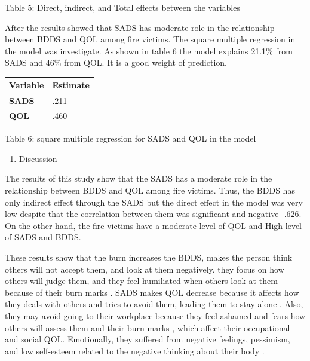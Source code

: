 \documentclass[10pt]{NSP1}
\makeatletter
\newcommand\jltx@wideopen{\par\addvspace{\medskipamount}\noindent}
\newcommand\jltx@wideclose{\par\addvspace{\medskipamount}}
\newenvironment{jltxspan}
  {\if@twocolumn\let\jltx@spannext\strip\else\let\jltx@spannext\jltx@wideopen\fi\jltx@spannext}
  {\if@twocolumn\let\jltx@spanend\endstrip\else\let\jltx@spanend\jltx@wideclose\fi\jltx@spanend}
\newcommand\JLTXaboveplacement{\par\addvspace{6pt plus 2pt minus 2pt}\noindent}
\newcommand\JLTXbelowplacement{\par\addvspace{6pt plus 2pt minus 2pt}}
\makeatother
\begin{document}
Table 5: Direct, indirect, and Total effects between the variables

After the results showed that SADS has moderate role in the relationship between BDDS and QOL among fire victims. The square multiple regression in the model was investigate. As shown in table 6 the model explains 21.1\% from SADS and 46\% from QOL. It is a good weight of prediction.

\JLTXaboveplacement \begin{jltxspan}%
\noindent\begin{minipage}{\linewidth}%
\centering
{\small
\begin{tabular}{|>{\centering\arraybackslash}p{}|>{\centering\arraybackslash}p{}|}
\hline
\cellcolor[HTML]{DDD9C3}\textbf{Variable} & \textbf{Estimate} \\
\hline
\cellcolor[HTML]{DDD9C3}\textbf{SADS} & .211 \\
\hline
\cellcolor[HTML]{DDD9C3}\textbf{QOL} & .460 \\
\hline
\end{tabular}}
%
\end{minipage}%
\end{jltxspan}\JLTXbelowplacement 

Table 6: square multiple regression for SADS and QOL in the model

\begin{enumerate}
  \item Discussion
\end{enumerate}

The results of this study show that the SADS has a moderate role in the relationship between BDDS and QOL among fire victims. Thus, the BDDS has only indirect effect through the SADS but the direct effect in the model was very low despite that the correlation between them was significant and negative -.626. On the other hand, the fire victims have a moderate level of QOL and High level of SADS and BDDS.

These results show that the burn increases the BDDS, makes the person think others will not accept them, and look at them negatively. they focus on how others will judge them, and they feel humiliated when others look at them because of their burn marks \cite{ref17}. SADS makes QOL decrease because it affects how they deals with others and tries to avoid them, leading them to stay alone \cite{ref18}. Also, they may avoid going to their workplace because they feel ashamed and fears how others will assess them and their burn marks \cite{ref19}, which affect their occupational and social QOL. Emotionally, they suffered from negative feelings, pessimism, and low self-esteem related to the negative thinking about their body \cite{ref20}.
\end{document}
